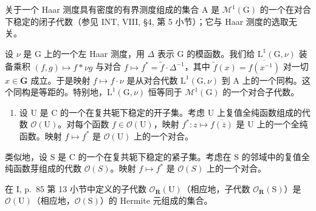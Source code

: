 关于一个 Haar 测度具有密度的有界测度组成的集合 A 是 \(\mathcal{M}^{1}(\mathrm{G})\) 的一个在对合下稳定的闭子代数（参见 INT, VIII, §4, 第 5 小节）；它与 Haar 测度的选取无关。

设 \(\nu\) 是 G 上的一个左 Haar 测度，用 \(\Delta\) 表示 G 的模函数。我们给 \(\mathrm{L}^1 (\mathrm{G},\nu)\) 装备乘积 \((f,g)\mapsto f*\nu g\) 与对合 \(f\mapsto f^{*} = \widetilde{f}\cdot \Delta^{-1}\)，其中 \(\widetilde{f} (x) = \overline{f(x^{-1})}\) 对一切 \(x\in \mathbf{G}\) 成立。于是映射 \(f\mapsto f\cdot \nu\) 是从对合代数 \(\mathrm{L}^1 (\mathrm{G},\nu)\) 到 A 上的一个同构。这个同构是等距的。特别地，\(\mathrm{L}^1 (\mathrm{G},\nu)\) 恒等同于 \(\mathcal{M}^1 (\mathrm{G})\) 的一个对合子代数。

\begin{enumerate}
\def\labelenumi{\arabic{enumi})}
\setcounter{enumi}{4}
\tightlist
\item
  设 U 是 C 的一个在复共轭下稳定的开子集。考虑 U 上复值全纯函数组成的代数 \(\mathcal{O}(\mathrm{U})\)。对每个函数 \(f \in \mathcal{O}(\mathrm{U})\)，映射 \(f^{*}: z \mapsto \overline{f(\overline{z})}\) 是 U 上的一个全纯函数。映射 \(f \mapsto f^{*}\) 是 \(\mathcal{O}(\mathrm{U})\) 上的一个对合。
\end{enumerate}

类似地，设 S 是 C 的一个在复共轭下稳定的紧子集。考虑在 S 的邻域中的复值全纯函数芽组成的代数 \(\mathcal{O}(S)\)。映射 \(f \mapsto f^{*}\) 是 \(\mathcal{O}(S)\) 上的一个对合。

在 I, p.~85 第 13 小节中定义的子代数 \(\mathcal{O}_{\mathbf{R}}(\mathrm{U})\)（相应地，子代数 \(\mathcal{O}_{\mathbf{R}}(\mathrm{S})\)）是 \(\mathcal{O}(\mathrm{U})\)（相应地，\(\mathcal{O}(\mathrm{S})\)）的 Hermite 元组成的集合。

